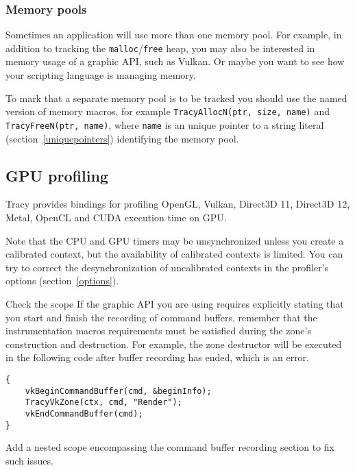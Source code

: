 \documentclass[hidelinks,titlepage,a4paper,twoside]{article}
\begin{document}
\subsubsection{Memory pools}
\label{memorypools}

Sometimes an application will use more than one memory pool. For example, in addition to tracking the \texttt{malloc}/\texttt{free} heap, you may also be interested in memory usage of a graphic API, such as Vulkan. Or maybe you want to see how your scripting language is managing memory.

To mark that a separate memory pool is to be tracked you should use the named version of memory macros, for example \texttt{TracyAllocN(ptr, size, name)} and \texttt{TracyFreeN(ptr, name)}, where \texttt{name} is an unique pointer to a string literal (section~\ref{uniquepointers}) identifying the memory pool.

\subsection{GPU profiling}
\label{gpuprofiling}

Tracy provides bindings for profiling OpenGL, Vulkan, Direct3D 11, Direct3D 12, Metal, OpenCL and CUDA execution time on GPU.

Note that the CPU and GPU timers may be unsynchronized unless you create a calibrated context, but the availability of calibrated contexts is limited. You can try to correct the desynchronization of uncalibrated contexts in the profiler's options (section~\ref{options}).

\begin{bclogo}[
noborder=true,
couleur=black!5,
logo=\bclampe
]{Check the scope}
If the graphic API you are using requires explicitly stating that you start and finish the recording of command buffers, remember that the instrumentation macros requirements must be satisfied during the zone's construction and destruction. For example, the zone destructor will be executed in the following code after buffer recording has ended, which is an error.

\begin{lstlisting}
{
    vkBeginCommandBuffer(cmd, &beginInfo);
    TracyVkZone(ctx, cmd, "Render");
    vkEndCommandBuffer(cmd);
}
\end{lstlisting}

Add a nested scope encompassing the command buffer recording section to fix such issues.
\end{bclogo}
\end{document}
